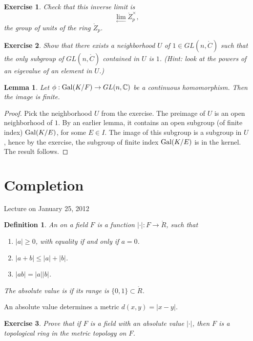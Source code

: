 \documentclass{amsart}
\newtheorem{definition}[equation]{Definition}
\newtheorem{lemma}[equation]{Lemma}
\newtheorem{exercise}{Exercise}
\def\abs#1{{|#1|}}
\begin{document}
\begin{exercise}
Check that this inverse limit is
\[
\lim_{\leftarrow} \ring{Z}_p^\times,
\]
the group of units of the ring $\ring{Z}_p$.
\end{exercise}

\begin{exercise}  Show that there exists a neighborhood $U$ of $1\in GL(n,\ring{C})$
such that the only subgroup of $GL(n,\ring{C})$ contained in $U$ is $1$.
(Hint: look at the powers of an eigevalue of an element in $U$.)
\end{exercise}

\begin{lemma} Let $\phi:{\operatorname{Gal}}(K/F)\to GL(n,\mathbb{C})$ be a continuous homomorphism.
Then the image is finite.
\end{lemma}

\begin{proof}  Pick the neighborhood $U$ from the exercise.  The preimage of $U$
is an open neighborhood of $1$.  By an earlier lemma, it contains an open subgroup
(of finite index)
${\operatorname{Gal}}(K/E)$, for some $E\in I$.  The image of this subgroup is a subgroup
in $U$, hence by the exercise, the subgroup of finite index
${\operatorname{Gal}}(K/E)$ is in the kernel.  The result follows.
\end{proof}





\newpage
\section{Completion}

Lecture on January 25, 2012

\begin{definition} An  on a field $F$ is a function
$\abs{\cdot}:F\to \ring{R}$, such that
\begin{enumerate}
\item $\abs{a}\ge 0$, with equality if and only if $a=0$.
\item $\abs{a + b}\le \abs{a} + \abs{b}$.
\item $\abs{a b} = \abs{a}\abs{b}$.
\end{enumerate}
The absolute value is  if its range is $\{0,1\}\subset\ring{R}$.
\end{definition}

An absolute value determines a metric $d(x,y) = \abs{x-y}$.

\begin{exercise} Prove that if $F$ is a field with an absolute value
  $\abs{\cdot}$, then $F$ is a topological ring in the metric topology
  on $F$.
\end{exercise}
\end{document}
